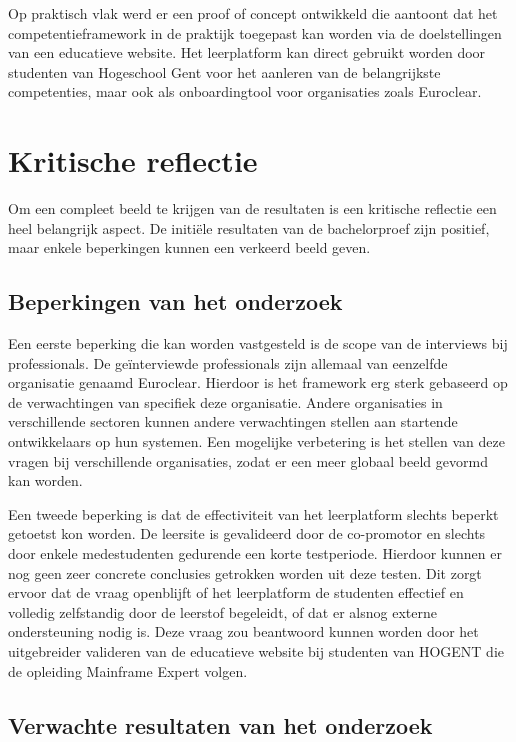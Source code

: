 Op praktisch vlak werd er een proof of concept ontwikkeld die aantoont dat het competentieframework in de praktijk toegepast kan worden via de doelstellingen van een educatieve website.
Het leerplatform kan direct gebruikt worden door studenten van Hogeschool Gent voor het aanleren van de belangrijkste competenties, maar ook als onboardingtool voor organisaties zoals Euroclear.

\section{Kritische reflectie}%
\label{sec:conclusie-reflectie}

Om een compleet beeld te krijgen van de resultaten is een kritische reflectie een heel belangrijk aspect.
De initiële resultaten van de bachelorproef zijn positief, maar enkele beperkingen kunnen een verkeerd beeld geven.

\subsection{Beperkingen van het onderzoek}%
\label{sec:beperkingen-reflectie}

Een eerste beperking die kan worden vastgesteld is de scope van de interviews bij professionals.
De geïnterviewde professionals zijn allemaal van eenzelfde organisatie genaamd Euroclear.
Hierdoor is het framework erg sterk gebaseerd op de verwachtingen van specifiek deze organisatie.
Andere organisaties in verschillende sectoren kunnen andere verwachtingen stellen aan startende ontwikkelaars op hun systemen.
Een mogelijke verbetering is het stellen van deze vragen bij verschillende organisaties, zodat er een meer globaal beeld gevormd kan worden.

Een tweede beperking is dat de effectiviteit van het leerplatform slechts beperkt getoetst kon worden.
De leersite is gevalideerd door de co-promotor en slechts door enkele medestudenten gedurende een korte testperiode.
Hierdoor kunnen er nog geen zeer concrete conclusies getrokken worden uit deze testen.
Dit zorgt ervoor dat de vraag openblijft of het leerplatform de studenten effectief en volledig zelfstandig door de leerstof begeleidt, of dat er alsnog externe ondersteuning nodig is.
Deze vraag zou beantwoord kunnen worden door het uitgebreider valideren van de educatieve website bij studenten van HOGENT die de opleiding Mainframe Expert volgen.

\subsection{Verwachte resultaten van het onderzoek}%
\label{sec:verwachte-resultaat-reflectie}

